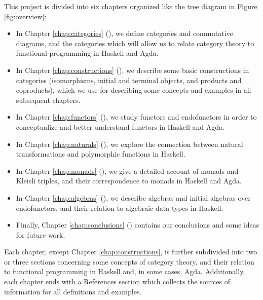This project is divided into six chapters organized like the tree
diagram in Figure \ref{fig:overview}:
\begin{itemize}
\item
  In Chapter \ref{chap:categories} (), we
  define categories and commutative diagrams, and the categories which
  will allow us to relate category theory to functional programming in
  Haskell and Agda.

\item
  In Chapter \ref{chap:constructions} (),
  we describe some basic constructions in categories (isomorphisms,
  initial and terminal objects, and products and coproducts), which we
  use for describing some concepts and examples in all subsequent
  chapters.

\item
  In Chapter \ref{chap:functors} (), we study
  functors and endofunctors in order to conceptualize and better
  understand functors in Haskell and Agda.

\item
  In Chapter \ref{chap:naturals} (), we explore
  the connection between natural transformations and polymorphic
  functions in Haskell.

\item
  In Chapter \ref{chap:monads} (), we give a
  detailed account of monads and Kleisli triples, and their
  correspondence to monads in Haskell and Agda.

\item
  In Chapter \ref{chap:algebras} (), we
  describe algebras and initial algebras over endofunctors, and their
  relation to algebraic data types in Haskell.

\item
  Finally, Chapter \ref{chap:conclusions} ()
  contains our conclusions and some ideas for future work.

\end{itemize}

Each chapter, except Chapter \ref{chap:constructions}, is further
subdivided into two or three sections concerning some concepts of
category theory, and their relation to functional programming in
Haskell and, in some cases, Agda. Additionally, each chapter ends with
a References section which collects the sources of information for all
definitions and examples.


